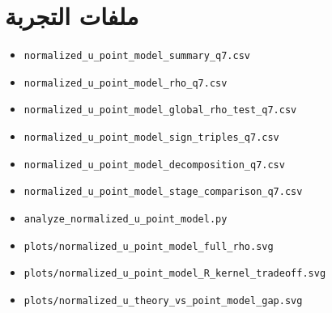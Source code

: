 \documentclass[12pt]{article}
\begin{document}
\section{ملفات التجربة}

\begin{itemize}
\item \texttt{normalized\_u\_point\_model\_summary\_q7.csv}
\item \texttt{normalized\_u\_point\_model\_rho\_q7.csv}
\item \texttt{normalized\_u\_point\_model\_global\_rho\_test\_q7.csv}
\item \texttt{normalized\_u\_point\_model\_sign\_triples\_q7.csv}
\item \texttt{normalized\_u\_point\_model\_decomposition\_q7.csv}
\item \texttt{normalized\_u\_point\_model\_stage\_comparison\_q7.csv}
\item \texttt{analyze\_normalized\_u\_point\_model.py}
\item \texttt{plots/normalized\_u\_point\_model\_full\_rho.svg}
\item \texttt{plots/normalized\_u\_point\_model\_R\_kernel\_tradeoff.svg}
\item \texttt{plots/normalized\_u\_theory\_vs\_point\_model\_gap.svg}
\end{itemize}
\end{document}
